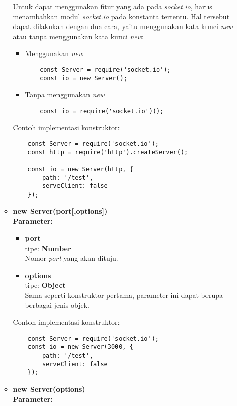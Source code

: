 \begin{enumerate}
\begin{itemize}
		Untuk dapat menggunakan fitur yang ada pada \textit{socket.io}, harus menambahkan modul \textit{socket.io} pada konstanta tertentu. Hal tersebut dapat dilakukan dengan dua cara, yaitu menggunakan kata kunci \textit{new} atau tanpa menggunakan kata kunci \textit{new}:
		
		\begin{itemize}
			\item Menggunakan \textit{new}
			\begin{lstlisting}
	const Server = require('socket.io');
	const io = new Server();
			\end{lstlisting}
			
			\item Tanpa menggunakan \textit{new}
			\begin{lstlisting}
	const io = require('socket.io')();
			\end{lstlisting}
		\end{itemize}
	
	Contoh implementasi konstruktor:
	
	\begin{lstlisting}
	const Server = require('socket.io');
	const http = require('http').createServer();
		
	const io = new Server(http, {
		path: '/test',
		serveClient: false
	});
	\end{lstlisting}
	
	\item \textbf{new Server(port[,options])} \\
	\textbf{Parameter:}
	\begin{itemize}
		\item \textbf{port} \\ tipe: \textbf{Number} \\ Nomor \textit{port} yang akan dituju.
		\item \textbf{options} \\ tipe: \textbf{Object} \\ Sama seperti konstruktor pertama, parameter ini dapat berupa berbagai jenis objek.
	\end{itemize}
	
	Contoh implementasi konstruktor: 
	\begin{lstlisting}
	const Server = require('socket.io');
	const io = new Server(3000, {
		path: '/test',
		serveClient: false
	});
	\end{lstlisting}
	
	\item \textbf{new Server(options)} \\ 
	\textbf{Parameter:}
	

\end{itemize}
\end{enumerate}
